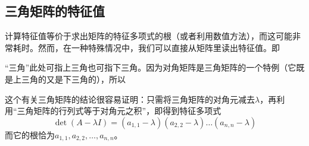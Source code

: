 \subsection{三角矩阵的特征值}\label{subsec:eigen_of_tri}

计算特征值等价于求出矩阵的特征多项式的根（或者利用数值方法），而这可能非常耗时。然而，在一种特殊情况中，我们可以直接从矩阵里读出特征值。即
\begin{center}
\end{center}

“三角”此处可指上三角也可指下三角。因为对角矩阵是三角矩阵的一个特例（它既是上三角的又是下三角的），所以
\begin{center}
\end{center}

这个有关三角矩阵的结论很容易证明：只需将三角矩阵的对角元减去$\lambda$，再利用“三角矩阵的行列式等于对角元之积”，即得到特征多项式
\[\det(A-\lambda I)=(a_{1,1}-\lambda)(a_{2,2}-\lambda)\ldots(a_{n,n}-\lambda)\]
而它的根恰为$a_{1,1},a_{2,2},\ldots,a_{n,n}$。

